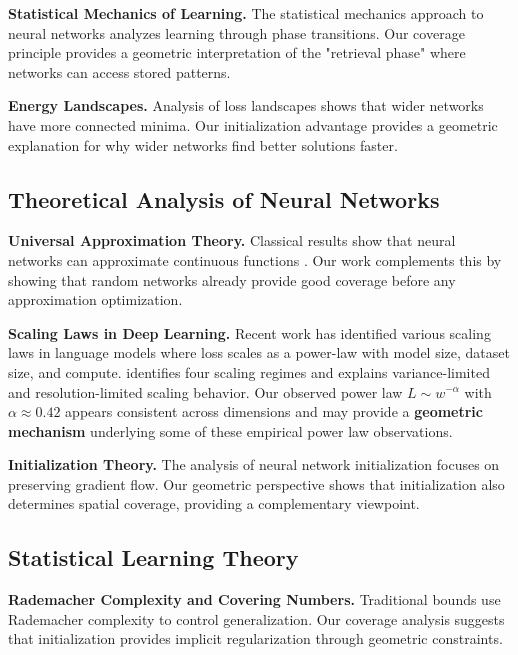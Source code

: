 \textbf{Statistical Mechanics of Learning.} The statistical mechanics approach to neural networks \cite{Engel2001StatisticalMO} analyzes learning through phase transitions. Our coverage principle provides a geometric interpretation of the "retrieval phase" where networks can access stored patterns.

\textbf{Energy Landscapes.} Analysis of loss landscapes \cite{Fort2020DeepLV} shows that wider networks have more connected minima. Our initialization advantage provides a geometric explanation for why wider networks find better solutions faster.

\subsection{Theoretical Analysis of Neural Networks}

\textbf{Universal Approximation Theory.} Classical results show that neural networks can approximate continuous functions \cite{Hornik1989MultilayerFN}. Our work complements this by showing that random networks already provide good coverage before any approximation optimization.

\textbf{Scaling Laws in Deep Learning.} Recent work has identified various scaling laws in language models \cite{Kaplan2020ScalingLF} where loss scales as a power-law with model size, dataset size, and compute. \cite{Bahri2024ExplainingNeural} identifies four scaling regimes and explains variance-limited and resolution-limited scaling behavior. Our observed power law $L \sim w^{-\alpha}$ with $\alpha \approx 0.42$ appears consistent across dimensions and may provide a \textbf{geometric mechanism} underlying some of these empirical power law observations.

\textbf{Initialization Theory.} The analysis of neural network initialization \cite{Glorot2010UnderstandingTD, He2015DelvingDI} focuses on preserving gradient flow. Our geometric perspective shows that initialization also determines spatial coverage, providing a complementary viewpoint.

\subsection{Statistical Learning Theory}

\textbf{Rademacher Complexity and Covering Numbers.} Traditional bounds use Rademacher complexity to control generalization. Our coverage analysis suggests that initialization provides implicit regularization through geometric constraints.

